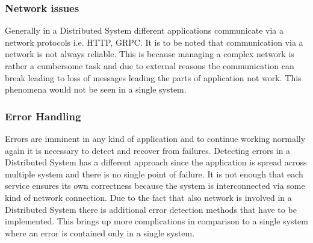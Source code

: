         \subsubsection{Network issues}
        Generally in a Distributed System different applications communicate via a network protocols i.e. HTTP, GRPC. It is to be noted that
        communication via a network is not always reliable. This is because managing a complex network is rather a cumbersome task and due to
        external reasons the communication can break leading to loss of messages leading the parts of application not work. This phenomena would not be
        seen in a single system.

        \subsubsection{Error Handling}
        Errors are imminent in any kind of application and to continue working normally again it is necessary to detect and recover from failures.
        Detecting errors in a Distributed System has a different approach since the application is spread across multiple system and there is no 
        single point of failure. It is not enough that each service ensures its own correctness because the system is interconnected via some kind of
        network connection. Due to the fact that also network is involved in a Distributed System there is additional error detection methods that have
        to be implemented. This brings up more complications in comparison to a single system where an error is contained only in a single system.

         
